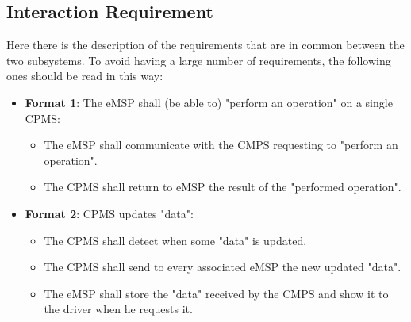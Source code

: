 \subsection{Interaction Requirement}
Here there is the description of the requirements that are in common between the two subsystems. To avoid having a large number of requirements, the following ones should be read in this way:\\
\begin{itemize}
    \item\textbf{Format 1}: The eMSP shall (be able to) "perform an operation" on a single CPMS:
    \begin{itemize}
        \item The eMSP shall communicate with the CMPS requesting to "perform an operation".
        \item The CPMS shall return to eMSP the result of the "performed operation".
    \end{itemize}
    \item \textbf{Format 2}: CPMS updates "data":
    \begin{itemize}
        \item The CPMS shall detect when some "data" is updated.
        \item The CPMS shall send to every associated eMSP the new updated "data".
        \item The eMSP shall store the "data" received by the CMPS and show it to the driver when he requests it.
    \end{itemize}
\end{itemize}
